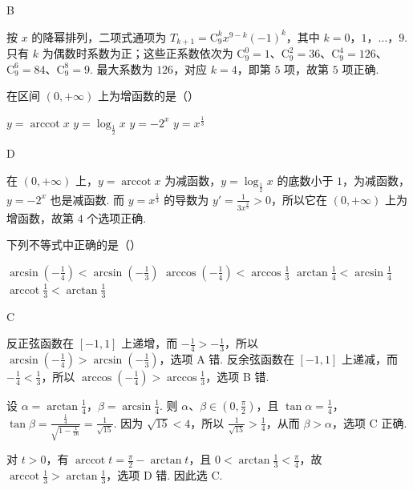\begin{answer}
B
\end{answer}

\begin{solution}
按 \(x\) 的降幂排列，二项式通项为
\(T_{k+1}=\mathrm C_9^k x^{9-k}(-1)^k\)，其中 \(k=0\)，\(1\)，\(\ldots\)，\(9\). 只有 \(k\) 为偶数时系数为正；这些正系数依次为
\(\mathrm C_9^0=1\)、\(\mathrm C_9^2=36\)、\(\mathrm C_9^4=126\)、\(\mathrm C_9^6=84\)、\(\mathrm C_9^8=9\). 最大系数为 \(126\)，对应 \(k=4\)，即第 \(5\) 项，故第 \(5\) 项正确.
\end{solution}

\begin{problem}
在区间 \((0, +\infty)\) 上为增函数的是（\quad）

\choices
    {\(y = \operatorname{arccot} x\)}
    {\(y = \log_{\frac{1}{2}} x\)}
    {\(y = -2^{x}\)}
    {\(y = x^{\frac{1}{3}}\)}
\end{problem}

\begin{answer}
D
\end{answer}

\begin{solution}
在 \((0,+\infty)\) 上，\(y=\operatorname{arccot}x\) 为减函数，\(y=\log_{\frac12}x\) 的底数小于 \(1\)，为减函数，\(y=-2^x\) 也是减函数. 而
\(y=x^{\frac13}\) 的导数为 \(y'=\frac{1}{3x^{\frac23}}>0\)，所以它在 \((0,+\infty)\) 上为增函数，故第 \(4\) 个选项正确.
\end{solution}

\begin{problem}
下列不等式中正确的是（\quad）

\choices
    {\(\arcsin \left(-\frac{1}{4}\right) < \arcsin \left(-\frac{1}{3}\right)\)}
    {\(\arccos \left(-\frac{1}{4}\right) < \arccos \frac{1}{3}\)}
    {\(\arctan \frac{1}{4} < \arcsin \frac{1}{4}\)}
    {\(\operatorname{arccot} \frac{1}{3} < \arctan \frac{1}{3}\)}
\end{problem}

\begin{answer}
C
\end{answer}

\begin{solution}
反正弦函数在 \([-1,1]\) 上递增，而 \(-\frac14>-\frac13\)，所以
\(\arcsin\left(-\frac14\right)>\arcsin\left(-\frac13\right)\)，选项 A 错. 反余弦函数在 \([-1,1]\) 上递减，而 \(-\frac14<\frac13\)，所以
\(\arccos\left(-\frac14\right)>\arccos\frac13\)，选项 B 错.

设 \(\alpha=\arctan\frac14\)，\(\beta=\arcsin\frac14\). 则 \(\alpha\)、\(\beta\in\left(0,\frac\pi2\right)\)，且
\(\tan\alpha=\frac14\)，\(\tan\beta=\frac{\frac{1}{4}}{\sqrt{1-\frac{1}{16}}}=\frac{1}{\sqrt{15}}\). 因为 \(\sqrt{15}<4\)，所以 \(\frac{1}{\sqrt{15}} > \frac14\)，从而 \(\beta>\alpha\)，选项 C 正确.

对 \(t>0\)，有 \(\operatorname{arccot}t=\frac\pi2-\arctan t\)，且 \(0<\arctan\frac13<\frac\pi4\)，故 \(\operatorname{arccot}\frac13>\arctan\frac13\)，选项 D 错. 因此选 C.
\end{solution}

